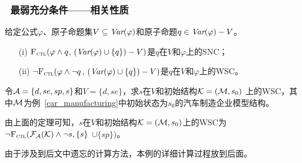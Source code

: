 \documentclass[9pt, CJK]{beamer}
\begin{document}
\begin{frame}
	\frametitle{~最弱充分条件——{\footnotesize 相关性质}}
	{\footnotesize
		\begin{theorem}\label{thm:SNC:WSC:forget}
		给定公式$\varphi$、原子命题集$V\subseteq\textit{Var}(\varphi)$和原子命题$q\in\textit{Var}(\varphi)- V$。
		\begin{itemize}
			\item[(i)] ${\textsc{F}_{\textsc{ctl}}} (\varphi \land q$, $(\textit{Var}(\varphi) \cup \{q\}) - V)$是$q$在$V$和$\varphi$上的SNC；
			\item[(ii)]  $\neg{\textsc{F}_{\textsc{ctl}}} (\varphi \land \neg q$, $(\textit{Var}(\varphi) \cup \{q\}) - V)$是$q$在$V$和$\varphi$上的WSC。
		\end{itemize}
	\end{theorem}
	\begin{example}
		\label{exam:SNCandWSC}
		令${\cal A}=\{d,se,sp,s\}$和$V=\{d,se\}$，求$s$在$V$和初始结构${\cal K} = ({\cal M},s_0)$ 上的WSC，其中${\cal M}$为例~\ref{car_manufacturing}中初始状态为$s_0$的汽车制造企业模型结构。
		
		由上面的定理可知，$s$在$V$和初始结构${\cal K} = ({\cal M},s_0)$上的WSC为$\neg {\textsc{F}_{\textsc{ctl}}}({\cal F}_{{\cal A}}({\cal K}) \wedge \neg s, \{s\}$ $\cup \{sp\})$。
		
		由于涉及到后文中遗忘的计算方法，本例的详细计算过程放到后面。
	\end{example}
	}
\end{frame}
\end{document}
